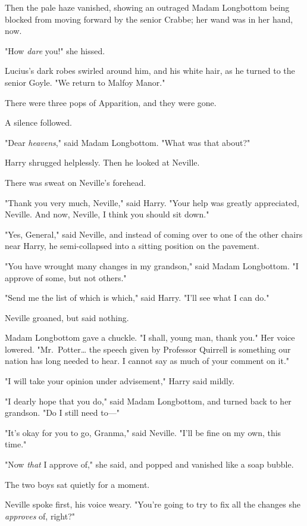 Then the pale haze vanished, showing an outraged Madam Longbottom being blocked 
from moving forward by the senior Crabbe; her wand was in her hand, now.

"How \emph{dare} you!" she hissed.

Lucius's dark robes swirled around him, and his white hair, as he turned to the 
senior Goyle. "We return to Malfoy Manor."

There were three pops of Apparition, and they were gone.

A silence followed.

"Dear \emph{heavens}," said Madam Longbottom. "What was that about?"

Harry shrugged helplessly. Then he looked at Neville.

There was sweat on Neville's forehead.

"Thank you very much, Neville," said Harry. "Your help was greatly appreciated, 
Neville. And now, Neville, I think you should sit down."

"Yes, General," said Neville, and instead of coming over to one of the other 
chairs near Harry, he semi-collapsed into a sitting position on the pavement.

"You have wrought many changes in my grandson," said Madam Longbottom. "I 
approve of some, but not others."

"Send me the list of which is which," said Harry. "I'll see what I can do."

Neville groaned, but said nothing.

Madam Longbottom gave a chuckle. "I shall, young man, thank you." Her voice 
lowered. "Mr.~Potter{\ldots} the speech given by Professor Quirrell is 
something our nation has long needed to hear. I cannot say as much of your 
comment on it."

"I will take your opinion under advisement," Harry said mildly.

"I dearly hope that you do," said Madam Longbottom, and turned back to her 
grandson. "Do I still need to---"

"It's okay for you to go, Granma," said Neville. "I'll be fine on my own, this 
time."

"Now \emph{that} I approve of," she said, and popped and vanished like a soap 
bubble.

The two boys sat quietly for a moment.

Neville spoke first, his voice weary. "You're going to try to fix all the 
changes she \emph{approves} of, right?"

